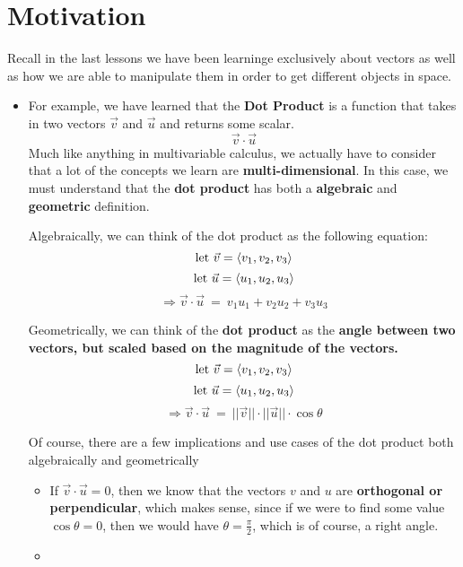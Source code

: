 \documentclass{report}
\begin{document}
\begin{sloppypar}
\section{Motivation}
Recall in the last lessons we have been
learninge exclusively about vectors as well
as how we are able to manipulate them in order
to get different objects in space.
\begin{itemize}
  \item For example, we have learned that the
        \textbf{Dot Product} is a function that takes
        in two vectors $ \vec{v}$ and $ \vec{u}$
        and returns some scalar.
        \[ \vec{v} \cdot \vec{u}  \]
        Much like anything in multivariable calculus,
        we actually have to consider that a lot of the
        concepts we learn are \textbf{multi-dimensional}.
        In this case, we must understand that the
        \textbf{dot product} has both a \textbf{algebraic}
        and \textbf{geometric} definition.
        \par Algebraically, we can think of the dot product
        as the following equation:
        \[ \textrm{let $ \vec{v} = \langle v_{1}, v_{2}, v_{3} \rangle $}\]
        \[ \textrm{let $ \vec{u} = \langle u_{1}, u_{2}, u_{3} \rangle$}\]
        \[ \Rightarrow
        \vec{v} \cdot \vec{u} ~ = ~ v_{1}u_{1} + v_{2}u_{2}
        + v_{3}u_{3} \]
        \par Geometrically, we can think of the
        \textbf{dot product} as the \textbf{angle between
        two vectors, but scaled based on the magnitude
        of the vectors.}
        \[ \textrm{let $ \vec{v} = \langle v_{1}, v_{2}, v_{3} \rangle $}\]
        \[ \textrm{let $ \vec{u} = \langle u_{1}, u_{2}, u_{3} \rangle$}\]
        \[ \Rightarrow \vec{v} \cdot \vec{u} ~ = ~
        ||\vec{v}|| \cdot ||\vec{u}|| \cdot \cos{\theta}\]
        \par Of course, there are a few implications and
        use cases of the dot product both algebraically
        and geometrically
        \begin{itemize}
          \item If $ \vec{v} \cdot \vec{u} = 0 $,
                then we know that the vectors $ v $ and
                $ u $ are \textbf{orthogonal or
                perpendicular}, which makes sense,
                since if we were to find some value
                $ \cos{\theta} = 0$, then we would have
                $ \theta = \frac{\pi}{2} $, which is of
                course, a right angle.
                \item
        \end{itemize}


\end{itemize}
\end{sloppypar}
\end{document}
